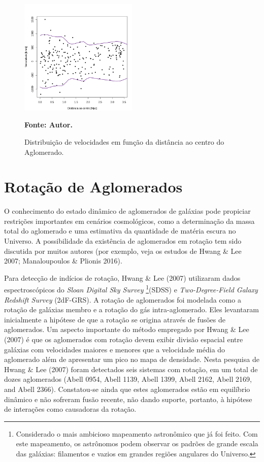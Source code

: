 \begin{figure}[H]
	\centering
	\includegraphics[width=0.5\textwidth]{04-figuras/10043}
	\caption{Distribuição de velocidades em função da distância ao centro do Aglomerado.}
	\textbf{Fonte: Autor.}
	\label{fig2}
\end{figure}

\chapter{Rotação de Aglomerados}

O conhecimento do estado dinâmico de aglomerados de galáxias pode propiciar restrições importantes em cenários cosmológicos, como a determinação da massa total do aglomerado e uma estimativa da quantidade de matéria escura no Universo. A possibilidade da existência de aglomerados em rotação tem sido discutida por muitos autores (por exemplo, veja os estudos de Hwang \& Lee 2007; Manaloupoulos \& Plionis 2016). 

Para detecção de indícios de rotação, Hwang \& Lee (2007) utilizaram dados espectroscópicos do \textit{Sloan Digital Sky Survey} \footnote{Considerado o mais ambicioso mapeamento astronômico que já foi feito. Com este mapeamento, os astrônomos podem observar os padrões de grande escala das galáxias: filamentos e vazios em grandes regiões angulares do Universo.}(SDSS) e \textit{Two-Degree-Field Galaxy Redshift Survey} (2dF-GRS). A rotação de aglomerados foi modelada como a rotação de galáxias membro e a rotação do gás intra-aglomerado. Eles levantaram inicialmente a hipótese de que a rotação se origina através de fusões de aglomerados. Um aspecto importante do método empregado por Hwang \& Lee (2007) é que os aglomerados com rotação devem exibir divisão espacial entre galáxias com velocidades maiores e menores que a velocidade média do aglomerado além de apresentar um pico no mapa de densidade. Nesta pesquisa de Hwang \& Lee (2007) foram detectados seis sistemas com rotação, em um total de dozes aglomerados (Abell 0954, Abell 1139, Abell 1399, Abell 2162, Abell 2169, and Abell 2366). Constatou-se ainda que estes aglomerados estão em equilíbrio dinâmico e não sofreram fusão recente, não dando suporte, portanto, à hipótese de interações como causadoras da rotação. 

